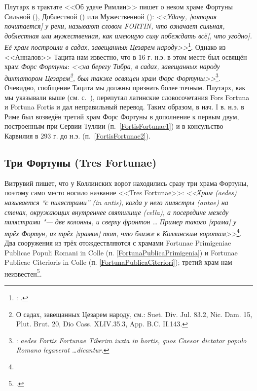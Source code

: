 Плутарх в трактате <<Об удаче Римлян>> пишет о неком храме Фортуны Сильной (), Доблестной () или Мужественной (): \textit{<<Удачу, [которая почитается] у реки, называют словом FORTIN, что означает сильная, доблестная или мужественная, как имеющую силу побеждать всё[, что угодно]. Её храм построили в садах, завещанных Цезарем народу>>}\footnote{: .}. Однако из <<Анналов>> Тацита нам известно, что в 16 г. н.э. в этом месте был освящён храм \textit{Форс Фортуны}: \textit{<<на берегу Тибра, в садах, завещанных народу диктатором Цезарем\footnote{О садах, завещанных Цезарем народу, см.: Suet. Div. Jul. 83.2, Nic. Dam. 15, Plut. Brut. 20, Dio Cass. XLIV.35.3, App. B.C. II.143.}, был также освящен храм Форс Фортуны>>}\footnote{: \textit{aedes Fortis Fortunae Tiberim iuxta in hortis, quos Caesar dictator populo Romano legaverat \ldots dicantur}.}. Очевидно, сообщение Тацита мы должны признать более точным. Плутарх, как мы указывали выше (см. с.~\pageref{LapsusGraecorum}), перепутал латинские словосочетания Fors Fortuna и Fortuna Fortis и дал неправильный перевод. Таким образом, в нач. I в. н.э. в Риме был возведён третий храм Форс Фортуны в дополнение к первым двум, построенным при Сервии Туллии (п.~\ref{FortisFortunae1}) и в консульство Карвилия в 293 г. до н.э. (п.~\ref{FortisFortunae2}).


\subsection{Три Фортуны (Tres Fortunae)}\label{TresFortunae}

Витрувий пишет, что у Коллинских ворот находились сразу три храма Фортуны, поэтому само место носило название <<Tres Fortunae>>: \textit{<<Храм (aedes) называется ``с пилястрами'' (in antis), когда у него пилястры (antae) на стенах, окружающих внутреннее святилище (cella), а посередине между пилястрами "--- две колонны, и сверху фронтон \ldots{} Пример такого [храма] у трёх Фортун, из трёх [храмов] тот, что ближе к Коллинским воротам>>}\footnote{}. Два сооружения из трёх отождествляются с храмами Fortunae Primigeniae Publicae Populi Romani in Colle (п. \ref{FortunaPublicaPrimigenia}) и Fortunae Publicae Citerioris in Colle (п. \ref{FortunaPublicaCiteriori}); третий храм нам неизвестен\footcite[P. 9--10]{Champeaux1987}.

